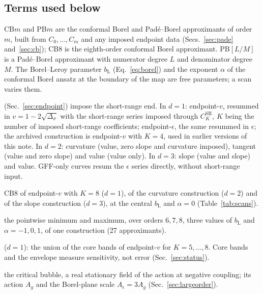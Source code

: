 \documentclass[11pt,a4paper]{article}
\numberwithin{equation}{section}
\newcommand{\Ds}{\Delta_\sigma}
\newcommand{\Ae}{A_\epsilon}
\newcommand{\Ag}{A_g}
\newcommand{\bL}{b_{\mathrm L}}
\newcommand{\CSR}{C^{\mathrm{SR}}}
\begin{document}
\subsection{Terms used below}\label{sec:terms}
\begin{description}[itemsep=1pt,leftmargin=1.2em]
\item[Approximants.] CB$m$ and PB$m$ are the conformal Borel and Pad\'e--Borel approximants
of order $m$, built from $C_0,\dots,C_m$ and any imposed endpoint data (Secs.~\ref{sec:pade}
and~\ref{sec:cb}); CB8 is the
eighth-order conformal Borel approximant. PB$[L/M]$ is a Pad\'e--Borel approximant with
numerator degree $L$ and denominator degree $M$. The Borel--Leroy parameter $\bL$
(Eq.~\eqref{eq:borel}) and the exponent $\alpha$ of the conformal Borel ansatz at the
boundary of the map are free parameters; a scan varies them.
\item[Endpoint constructions] (Sec.~\ref{sec:endpoint}) impose the short-range end. In
$d=1$: endpoint-$v$, resummed in $v=1-2\sqrt{\Ds}$ with the short-range series imposed
through $\CSR_K$, $K$ being the number of imposed short-range coefficients; endpoint-$\epsilon$,
the same resummed in $\epsilon$; the archived construction is endpoint-$v$ with $K=4$, used
in earlier versions of this note. In $d=2$: curvature (value, zero slope and curvature
imposed), tangent (value and zero slope) and value (value only). In $d=3$: slope (value and
slope) and value. GFF-only curves resum the $\epsilon$ series directly, without short-range
input.
\item[Baseline:] CB8 of endpoint-$v$ with $K=8$ ($d=1$), of the curvature construction
($d=2$) and of the slope construction ($d=3$), at the central $\bL$ and $\alpha=0$
(Table~\ref{tab:scans}).
\item[Core band:] the pointwise minimum and maximum, over orders $6,7,8$, three values of
$\bL$ and $\alpha=-1,0,1$, of one construction (27 approximants).
\item[Sensitivity envelope] ($d=1$): the union of the core bands of endpoint-$v$ for
$K=5,\dots,8$. Core bands and the envelope measure sensitivity, not error
(Sec.~\ref{sec:status}).
\item[Instanton:] the critical bubble, a real stationary field of the action at negative
coupling; its action $\Ag$ and the Borel-plane scale $\Ae=3\Ag$ (Sec.~\ref{sec:largeorder}).
\end{description}
\end{document}
